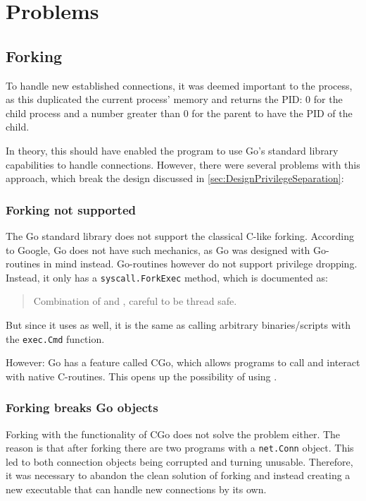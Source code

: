 \documentclass[10pt,a4paper,titlepage,twoside,english,final]{zhawreprt}
\begin{document}
\section{Problems}\label{sec:Problems}
\subsection{Forking}\label{ssec:Forking}
To handle new established connections, it was deemed important to \cite{fork} the process, as this duplicated the current process' memory and returns the \gls{PID}:
0 for the child process and a number greater than 0 for the parent to have the \gls{PID} of the child.

In theory, this should have enabled the program to use \gls{Go}'s standard library capabilities to handle connections.
However, there were several problems with this approach, which break the design discussed in \ref{sec:DesignPrivilegeSeparation}:

\subsubsection{Forking not supported}\label{sssec:ForkingNotSupported}
The \gls{Go} standard library does not support the classical \gls{C}-like forking.
According to Google, \gls{Go} does not have such mechanics, as \gls{Go} was designed with \gls{Go}-routines in mind instead.
\gls{Go}-routines however do not support privilege dropping.
Instead, it only has a \texttt{syscall.ForkExec} method, which is documented as:
\begin{quote}
Combination of \cite{fork} and \cite{exec}, careful to be thread safe.
\end{quote}
But since it uses \cite{exec} as well, it is the same as calling arbitrary binaries/scripts with the \texttt{exec.Cmd} function.

However: \gls{Go} has a feature called \gls{CGo}, which allows programs to call and interact with native \gls{C}-routines.
This opens up the possibility of using \cite{fork}.

\subsubsection{Forking breaks Go objects}\label{sssec:ForkingBreaksGoObjects}
Forking with the functionality of \gls{CGo} does not solve the problem either.
The reason is that after forking there are two programs with a \texttt{net.Conn} object.
This led to both connection objects being corrupted and turning unusable.
Therefore, it was necessary to abandon the clean solution of forking and instead creating a new executable that can handle new connections by its own.
\end{document}
